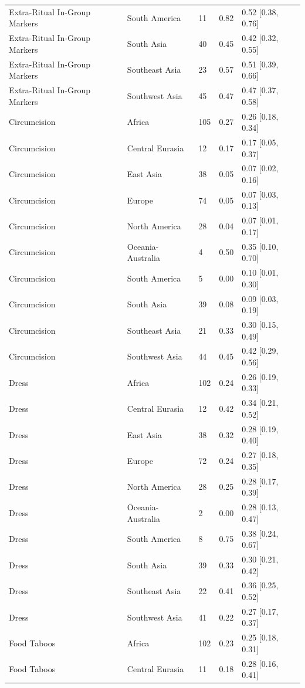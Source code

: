 \begin{longtable}{lllll}
Extra-Ritual In-Group Markers & South America & 11 & 0.82 & 0.52 [0.38, 0.76] \\
Extra-Ritual In-Group Markers & South Asia & 40 & 0.45 & 0.42 [0.32, 0.55] \\
Extra-Ritual In-Group Markers & Southeast Asia & 23 & 0.57 & 0.51 [0.39, 0.66] \\
Extra-Ritual In-Group Markers & Southwest Asia & 45 & 0.47 & 0.47 [0.37, 0.58] \\
Circumcision & Africa & 105 & 0.27 & 0.26 [0.18, 0.34] \\
Circumcision & Central Eurasia & 12 & 0.17 & 0.17 [0.05, 0.37] \\
Circumcision & East Asia & 38 & 0.05 & 0.07 [0.02, 0.16] \\
Circumcision & Europe & 74 & 0.05 & 0.07 [0.03, 0.13] \\
Circumcision & North America & 28 & 0.04 & 0.07 [0.01, 0.17] \\
Circumcision & Oceania-Australia & 4 & 0.50 & 0.35 [0.10, 0.70] \\
Circumcision & South America & 5 & 0.00 & 0.10 [0.01, 0.30] \\
Circumcision & South Asia & 39 & 0.08 & 0.09 [0.03, 0.19] \\
Circumcision & Southeast Asia & 21 & 0.33 & 0.30 [0.15, 0.49] \\
Circumcision & Southwest Asia & 44 & 0.45 & 0.42 [0.29, 0.56] \\
Dress & Africa & 102 & 0.24 & 0.26 [0.19, 0.33] \\
Dress & Central Eurasia & 12 & 0.42 & 0.34 [0.21, 0.52] \\
Dress & East Asia & 38 & 0.32 & 0.28 [0.19, 0.40] \\
Dress & Europe & 72 & 0.24 & 0.27 [0.18, 0.35] \\
Dress & North America & 28 & 0.25 & 0.28 [0.17, 0.39] \\
Dress & Oceania-Australia & 2 & 0.00 & 0.28 [0.13, 0.47] \\
Dress & South America & 8 & 0.75 & 0.38 [0.24, 0.67] \\
Dress & South Asia & 39 & 0.33 & 0.30 [0.21, 0.42] \\
Dress & Southeast Asia & 22 & 0.41 & 0.36 [0.25, 0.52] \\
Dress & Southwest Asia & 41 & 0.22 & 0.27 [0.17, 0.37] \\
Food Taboos & Africa & 102 & 0.23 & 0.25 [0.18, 0.31] \\
Food Taboos & Central Eurasia & 11 & 0.18 & 0.28 [0.16, 0.41] \\

\end{longtable}
